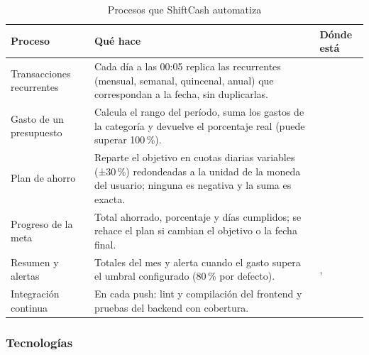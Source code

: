 \begin{table}[H]
\caption{Procesos que ShiftCash automatiza}
\label{tab:procesos}
\begin{tabularx}{\linewidth}{L{3.4cm} Y L{3.6cm}}
\toprule
Proceso & Qué hace & Dónde está \\
\midrule
Transacciones recurrentes & Cada día a las 00:05 replica las recurrentes (mensual, semanal, quincenal, anual) que correspondan a la fecha, sin duplicarlas. &  \\
Gasto de un presupuesto & Calcula el rango del período, suma los gastos de la categoría y devuelve el porcentaje real (puede superar 100\,\%). &  \\
Plan de ahorro & Reparte el objetivo en cuotas diarias variables (±30\,\%) redondeadas a la unidad de la moneda del usuario; ninguna es negativa y la suma es exacta. &  \\
Progreso de la meta & Total ahorrado, porcentaje y días cumplidos; se rehace el plan si cambian el objetivo o la fecha final. &  \\
Resumen y alertas & Totales del mes y alerta cuando el gasto supera el umbral configurado (80\,\% por defecto). & ,  \\
Integración continua & En cada push: lint y compilación del frontend y pruebas del backend con cobertura. &  \\
\bottomrule
\end{tabularx}
\end{table}

\subsubsection{Tecnologías}

